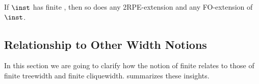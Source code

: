 \begin{theorem}\label{thm:closureproperties}
If $\inst$ has finite \hypercliquewidth{}, then so does any 2RPE-extension and any FO-extension of $\inst$.
\end{theorem}




 


\subsection{Relationship to Other Width Notions}\label{sec:hcw-vs-tw-cw}

In this section we are going to clarify how the notion of finite \ercwidth{} relates to those of finite treewidth and finite cliquewidth. 
 summarizes these insights.

